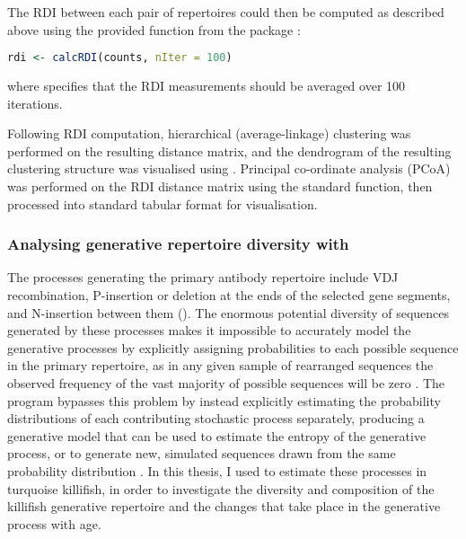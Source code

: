 \noindent The RDI between each pair of repertoires could then be computed as described above using the provided  function from the  package \parencite{bolen2017rdi}:

\begin{lstlisting}[language=R]
rdi <- calcRDI(counts, nIter = 100)
\end{lstlisting}

\noindent where  specifies that the RDI measurements should be averaged over 100 iterations.

Following RDI computation, hierarchical (average-linkage) clustering was performed on the resulting distance matrix, and the dendrogram of the resulting clustering structure was visualised using . Principal co-ordinate analysis (PCoA) was performed on the RDI distance matrix using the standard   function, then processed into standard tabular format for visualisation.

\subsubsection{Analysing generative repertoire diversity with }
\label{sec:methods_comp_igdownstream_igor}

The processes generating the primary antibody repertoire include VDJ recombination, P-insertion or deletion at the ends of the selected gene segments, and N-insertion between them (). The enormous potential diversity of sequences generated by these processes makes it impossible to accurately model the generative processes by explicitly assigning probabilities to each possible sequence in the primary repertoire, as in any given sample of rearranged sequences the observed frequency of the vast majority of possible sequences will be zero \parencite{marcou2018igor}. The program  bypasses this problem by instead explicitly estimating the probability distributions of each contributing stochastic process separately, producing a generative model that can be used to estimate the entropy of the generative process, or to generate new, simulated sequences drawn from the same probability distribution \parencite{marcou2018igor}. In this thesis, I used  to estimate these processes in turquoise killifish, in order to investigate the diversity and composition of the killifish generative repertoire and the changes that take place in the generative process with age.

